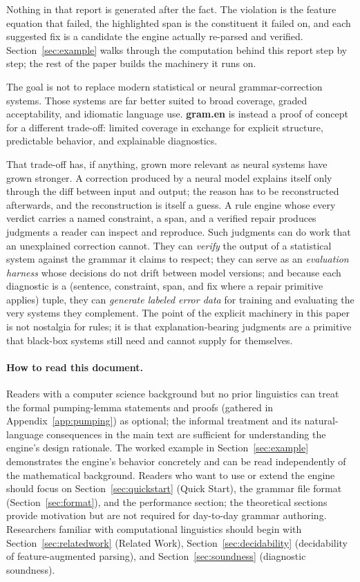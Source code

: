 \documentclass[11pt]{article}
\theoremstyle{definition}
\theoremstyle{plain}
\theoremstyle{remark}
\newcommand{\Gram}{\textbf{gram.en}}
\begin{document}
Nothing in that report is generated after the fact. The violation is the feature
equation that failed, the highlighted span is the constituent it failed on, and
each suggested fix is a candidate the engine actually re-parsed and verified.
Section~\ref{sec:example} walks through the computation behind this report step
by step; the rest of the paper builds the machinery it runs on.

The goal is not to replace modern statistical or neural grammar-correction systems. Those
systems are far better suited to broad coverage, graded acceptability, and idiomatic language
use. \Gram{} is instead a proof of concept for a different trade-off: limited coverage in
exchange for explicit structure, predictable behavior, and explainable diagnostics.

That trade-off has, if anything, grown more relevant as neural systems have grown
stronger. A correction produced by a neural model explains itself only through the
diff between input and output; the reason has to be reconstructed afterwards, and
the reconstruction is itself a guess. A rule engine whose every verdict carries a
named constraint, a span, and a verified repair produces judgments a reader can
inspect and reproduce. Such judgments can do work that an unexplained correction
cannot. They can \emph{verify} the output of a statistical
system against the grammar it claims to respect; they can serve as an
\emph{evaluation harness} whose decisions do not drift between model versions; and
because each diagnostic is a (sentence, constraint, span, and fix where a repair
primitive applies) tuple, they can \emph{generate labeled error data} for
training and evaluating the very systems they complement. The point of the explicit machinery in this paper is not nostalgia
for rules; it is that explanation-bearing judgments are a primitive that
black-box systems still need and cannot supply for themselves.

\paragraph{How to read this document.}
Readers with a computer science
background but no prior linguistics can treat the formal pumping-lemma statements and
proofs (gathered in Appendix~\ref{app:pumping}) as optional; the informal treatment and
its natural-language consequences in the main text are sufficient for understanding the
engine's design rationale.
The worked example in Section~\ref{sec:example} demonstrates the engine's behavior concretely
and can be read independently of the mathematical background. Readers who want to use or
extend the engine should focus on Section~\ref{sec:quickstart} (Quick Start), the grammar
file format (Section~\ref{sec:format}), and the performance section; the theoretical sections
provide motivation but are not required for day-to-day grammar authoring. Researchers familiar
with computational linguistics should begin with Section~\ref{sec:relatedwork} (Related Work),
Section~\ref{sec:decidability} (decidability of feature-augmented parsing), and
Section~\ref{sec:soundness} (diagnostic soundness).
\end{document}
